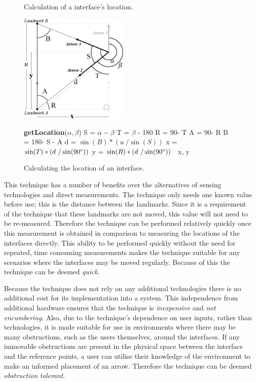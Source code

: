 \documentclass{bmcart}
\newenvironment{Algorithm}[1]{\begin{minipage}{0.45\textwidth}\centering\begin{minipage}{#1}\begin{algorithm}[H]}{\end{algorithm}\end{minipage}\end{minipage}}
\newcommand{\INDSTATE}[1][1]{\STATE\hspace{#1\algorithmicindent}}
\begin{document}
\begin{figure}[h]
   \centering
   \caption{Calculation of a interface's location.}
   \includegraphics[width=0.475\textwidth]{figures/trig-illustration.png}
   \label{fig:trig}

\begin{Algorithm}{6cm}
\caption{Calculating the location of an interface.}
\label{algo:location}
\begin{algorithmic}
\STATE \textbf{getLocation}(${\alpha}, {\beta}$)
\INDSTATE[2] S = $\alpha - \beta$
\INDSTATE[2] T = $\beta$ - 180\degree
\INDSTATE[2] R = 90\degree - T
\INDSTATE[2] A = 90\degree - R
\INDSTATE[2] B = 180\degree - S - A
\INDSTATE[2] d = $\sin (B) * (u\ / \sin (S))$
\INDSTATE[2] x = $\sin (T) * (d\ / \sin (90\degree))$
\INDSTATE[2] y = $\sin (R) * (d\ / \sin (90\degree))$
\ x, y
\end{algorithmic}
\end{Algorithm}
\end{figure}

This technique has a number of benefits over the alternatives of sensing technologies and direct measurements.
The technique only needs one known value before use; this is the distance between the landmarks.
Since it is a requirement of the technique that these landmarks are not moved, this value will not need to be re-measured.
Therefore the technique can be performed relatively quickly once this measurement is obtained in comparison to measuring the locations of the interfaces directly.
This ability to be performed quickly without the need for repeated, time consuming measurements makes the technique suitable for any scenarios where the interfaces may be moved regularly.
Because of this the technique can be deemed {\emph{quick}}.

Because the technique does not rely on any additional technologies there is no additional cost for its implementation into a system.
This independence from additional hardware ensures that the technique is {\emph{inexpensive}} and {\emph{not encumbering}}.
Also, due to the technique's dependence on user inputs, rather than technologies, it is made suitable for use in environments where there may be many obstructions, such as the users themselves, around the interfaces.
If any immovable obstructions are present in the physical space between the interface and the reference points, a user can utilise their knowledge of the environment to make an informed placement of an arrow.
Therefore the technique can be deemed {\emph{obstruction tolerant}}.
\end{document}
